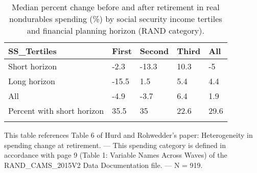 \begin{table}[tbp] \centering
{}

\caption{Median percent change before and after retirement in real nondurables spending (\%) by social security income tertiles and financial planning horizon (RAND category).}
\begin{tabularx}{\textwidth}{lCCCC}

\toprule
{SS\_Tertiles}&{First}&{Second}&{Third}&{All} \tabularnewline
\midrule\addlinespace[1.5ex]
Short horizon&-2.3&-13.3&10.3&-5 \tabularnewline
Long horizon&-15.5&1.5&5.4&4.4 \tabularnewline
All&-4.9&-3.7&6.4&1.9 \tabularnewline
Percent with short horizon&35.5&35&22.6&29.6 \tabularnewline
\bottomrule \addlinespace[1.5ex]

\end{tabularx}
\begin{flushleft}
\footnotesize This table references Table 6 of Hurd and Rohwedder's paper: Heterogeneity in spending change at retirement. \linebreak --- \linebreak This spending category is defined in accordance with page 9 (Table 1: Variable Names Across Waves) of the RAND\_CAMS\_2015V2 Data Documentation file. \linebreak --- \linebreak N = 919.
\end{flushleft}
\end{table}
